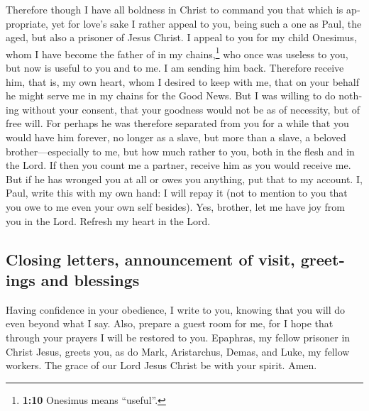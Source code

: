 \begin{paracol}{2}
\begin{otherlanguage}{english}
 Therefore though I have all boldness in Christ to command
you that which is appropriate,  yet for love's sake I
rather appeal to you, being such a one as Paul, the aged, but also a
prisoner of Jesus Christ.  I appeal to you for my child
Onesimus, whom I have become the father of in my chains,\footnote{\textbf{1:10}
  Onesimus means ``useful''.}  who once was useless to
you, but now is useful to you and to me.  I am sending
him back. Therefore receive him, that is, my own heart, 
whom I desired to keep with me, that on your behalf he might serve me in
my chains for the Good News.  But I was willing to do
nothing without your consent, that your goodness would not be as of
necessity, but of free will.  For perhaps he was
therefore separated from you for a while that you would have him
forever,  no longer as a slave, but more than a slave, a
beloved brother---especially to me, but how much rather to you, both in
the flesh and in the Lord.  If then you count me a
partner, receive him as you would receive me.  But if he
has wronged you at all or owes you anything, put that to my account.
 I, Paul, write this with my own hand: I will repay it
(not to mention to you that you owe to me even your own self besides).
 Yes, brother, let me have joy from you in the Lord.
Refresh my heart in the Lord.

\hypertarget{closing-letters-announcement-of-visit-greetings-and-blessings}{%
\subsection{Closing letters, announcement of visit, greetings and
blessings}\label{closing-letters-announcement-of-visit-greetings-and-blessings}}

 Having confidence in your obedience, I write to you,
knowing that you will do even beyond what I say.  Also,
prepare a guest room for me, for I hope that through your prayers I will
be restored to you.  Epaphras, my fellow prisoner in
Christ Jesus, greets you,  as do Mark, Aristarchus,
Demas, and Luke, my fellow workers.  The grace of our
Lord Jesus Christ be with your spirit. Amen.
\end{otherlanguage} \end{paracol}
